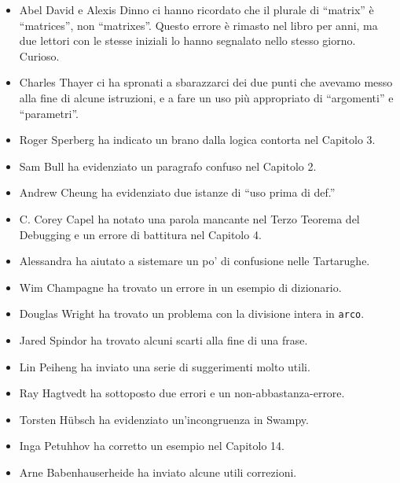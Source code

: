 \documentclass[10pt]{book}
\begin{document}
\begin{itemize}
\item Abel David e Alexis Dinno ci hanno ricordato che il plurale di
``matrix'' è ``matrices'', non ``matrixes''.  Questo errore è rimasto nel libro per anni, ma due lettori con le stesse iniziali lo hanno segnalato nello stesso giorno. Curioso.

\item Charles Thayer ci ha spronati a sbarazzarci dei due punti che avevamo messo alla fine di alcune istruzioni, e a fare un uso più appropriato di ``argomenti'' e ``parametri''.

\item Roger Sperberg ha indicato un brano dalla logica contorta nel Capitolo 3.

\item Sam Bull ha evidenziato un paragrafo confuso nel Capitolo 2.

\item Andrew Cheung ha evidenziato due istanze di ``uso prima di def.''

\item C. Corey Capel ha notato una parola mancante nel Terzo Teorema del Debugging e un errore di battitura nel Capitolo 4.

\item Alessandra ha aiutato a sistemare un po' di confusione nelle Tartarughe.

\item Wim Champagne ha trovato un errore in un esempio di dizionario.

\item Douglas Wright ha trovato un problema con la divisione intera in
{\tt arco}.

\item Jared Spindor ha trovato alcuni scarti alla fine di una frase.

\item Lin Peiheng ha inviato una serie di suggerimenti molto utili.

\item Ray Hagtvedt ha sottoposto due errori e un non-abbastanza-errore.

\item Torsten H\"{u}bsch ha evidenziato un'incongruenza in Swampy.

\item Inga Petuhhov ha corretto un esempio nel Capitolo 14.

\item Arne Babenhauserheide ha inviato alcune utili correzioni.


\end{itemize}
\end{document}
